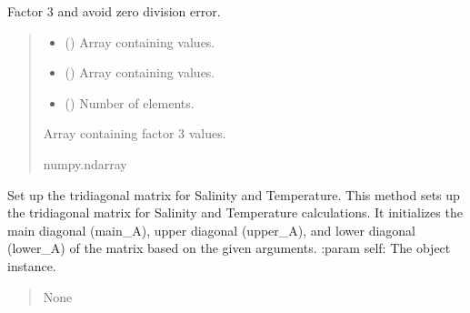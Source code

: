 \documentclass[a4paper,11pt,english,openany]{sphinxmanual}
\begin{document}
\begin{fulllineitems}
\begin{fulllineitems}
\label{\detokenize{api/spyice.models.advection_diffusion:spyice.models.advection_diffusion.AdvectionDiffusion.factor_3}}
\pysigstartsignatures
{}
\pysigstopsignatures
\sphinxAtStartPar
Factor 3 and avoid zero division error.
\begin{quote}\begin{description}
\begin{itemize}
\item {} 
\sphinxAtStartPar
{} () \textendash{} Array containing values.

\item {} 
\sphinxAtStartPar
{} () \textendash{} Array containing values.

\item {} 
\sphinxAtStartPar
{} () \textendash{} Number of elements.

\end{itemize}

\sphinxAtStartPar
Array containing factor 3 values.

\sphinxAtStartPar
numpy.ndarray

\end{description}\end{quote}

\end{fulllineitems}


\begin{fulllineitems}
\label{\detokenize{api/spyice.models.advection_diffusion:spyice.models.advection_diffusion.AdvectionDiffusion.set_up_tridiagonal}}
\pysigstartsignatures
{}
\pysigstopsignatures
\sphinxAtStartPar
Set up the tridiagonal matrix for Salinity and Temperature.
This method sets up the tridiagonal matrix for Salinity and Temperature calculations. It initializes the main diagonal (main\_A), upper diagonal (upper\_A), and lower diagonal (lower\_A) of the matrix based on the given arguments.
:param self: The object instance.
\begin{quote}\begin{description}
\sphinxAtStartPar
None


\end{description}
\end{quote}
\end{fulllineitems}
\end{fulllineitems}
\end{document}
